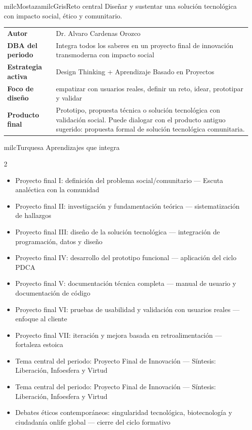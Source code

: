 \documentclass[11pt,letterpaper]{article}
\begin{document}
\begin{softbox}{milcMostaza}{milcGris}{Reto central}
Diseñar y sustentar una solución tecnológica con impacto social, ético y comunitario.
\end{softbox}

\begin{tabularx}{\textwidth}{>{\bfseries}p{3.4cm}X}
\rowcolor{milcMagenta!12}Autor & Dr. Alvaro Cardenas Orozco\\
DBA del periodo & Integra todos los saberes en un proyecto final de innovación transmoderna con impacto social\\
Estrategia activa & Design Thinking + Aprendizaje Basado en Proyectos\\
Foco de diseño & empatizar con usuarios reales, definir un reto, idear, prototipar y validar\\
Producto final & Prototipo, propuesta técnica o solución tecnológica con validación social. Puede dialogar con el producto antiguo sugerido: propuesta formal de solución tecnológica comunitaria.\\
\end{tabularx}

\begin{titlebox}{milcTurquesa}
Aprendizajes que integra
\end{titlebox}
\begin{multicols}{2}
\begin{itemize}[leftmargin=*]
\item Proyecto final I: definición del problema social/comunitario — Escuta analéctica con la comunidad
\item Proyecto final II: investigación y fundamentación teórica — sistematización de hallazgos
\item Proyecto final III: diseño de la solución tecnológica — integración de programación, datos y diseño
\item Proyecto final IV: desarrollo del prototipo funcional — aplicación del ciclo PDCA
\item Proyecto final V: documentación técnica completa — manual de usuario y documentación de código
\item Proyecto final VI: pruebas de usabilidad y validación con usuarios reales — enfoque al cliente
\item Proyecto final VII: iteración y mejora basada en retroalimentación — fortaleza estoica
\item Tema central del periodo: Proyecto Final de Innovación — Síntesis: Liberación, Infoesfera y Virtud
\item Tema central del periodo: Proyecto Final de Innovación — Síntesis: Liberación, Infoesfera y Virtud
\item Debates éticos contemporáneos: singularidad tecnológica, biotecnología y ciudadanía onlife global — cierre del ciclo formativo
\end{itemize}
\end{multicols}
\end{document}
